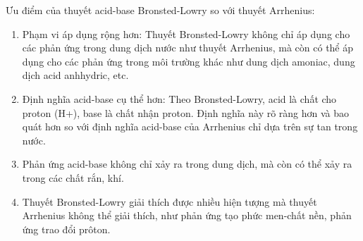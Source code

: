 \begin{tomtat}
	Ưu điểm của thuyết acid-base Bronsted-Lowry so với thuyết Arrhenius:
	\begin{enumerate}
		\item  Phạm vi áp dụng rộng hơn: Thuyết Bronsted-Lowry không chỉ áp dụng cho các phản ứng trong dung dịch nước như thuyết Arrhenius, mà còn có thể áp dụng cho các phản ứng trong môi trường khác như dung dịch amoniac, dung dịch acid anhhydric, etc.
		\item  Định nghĩa acid-base cụ thể hơn: Theo Bronsted-Lowry, acid là chất cho proton (H+), base là chất nhận proton. Định nghĩa này rõ ràng hơn và bao quát hơn so với định nghĩa acid-base của Arrhenius chỉ dựa trên sự tan trong nước.
		\item  Phản ứng acid-base không chỉ xảy ra trong dung dịch, mà còn có thể xảy ra trong các chất rắn, khí.
		\item  Thuyết Bronsted-Lowry giải thích được nhiều hiện tượng mà thuyết Arrhenius không thể giải thích, như phản ứng tạo phức men-chất nền, phản ứng trao đổi prôton.
	\end{enumerate}
\end{tomtat}
